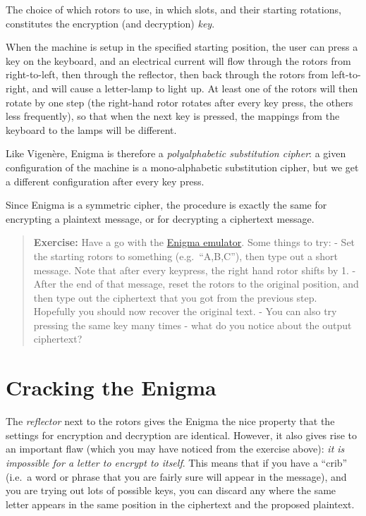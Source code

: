 \documentclass[
  letterpaper,
  DIV=11,
  numbers=noendperiod]{scrreprt}
\begin{document}
The choice of which rotors to use, in which slots, and their starting
rotations, constitutes the encryption (and decryption) \emph{key}.

When the machine is setup in the specified starting position, the user
can press a key on the keyboard, and an electrical current will flow
through the rotors from right-to-left, then through the reflector, then
back through the rotors from left-to-right, and will cause a letter-lamp
to light up. At least one of the rotors will then rotate by one step
(the right-hand rotor rotates after every key press, the others less
frequently), so that when the next key is pressed, the mappings from the
keyboard to the lamps will be different.

Like Vigenère, Enigma is therefore a \emph{polyalphabetic substitution
cipher}: a given configuration of the machine is a mono-alphabetic
substitution cipher, but we get a different configuration after every
key press.

Since Enigma is a symmetric cipher, the procedure is exactly the same
for encrypting a plaintext message, or for decrypting a ciphertext
message.

\begin{quote}
\textbf{Exercise:} Have a go with the
\href{https://www.101computing.net/enigma-machine-emulator/}{Enigma
emulator}. Some things to try: - Set the starting rotors to something
(e.g.~``A,B,C''), then type out a short message. Note that after every
keypress, the right hand rotor shifts by 1. - After the end of that
message, reset the rotors to the original position, and then type out
the ciphertext that you got from the previous step. Hopefully you should
now recover the original text. - You can also try pressing the same key
many times - what do you notice about the output ciphertext?
\end{quote}

\hypertarget{cracking-the-enigma}{%
\section{Cracking the Enigma}\label{cracking-the-enigma}}

The \emph{reflector} next to the rotors gives the Enigma the nice
property that the settings for encryption and decryption are identical.
However, it also gives rise to an important flaw (which you may have
noticed from the exercise above): \emph{it is impossible for a letter to
encrypt to itself}. This means that if you have a ``crib'' (i.e.~a word
or phrase that you are fairly sure will appear in the message), and you
are trying out lots of possible keys, you can discard any where the same
letter appears in the same position in the ciphertext and the proposed
plaintext.
\end{document}
